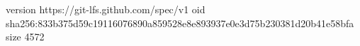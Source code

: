 version https://git-lfs.github.com/spec/v1
oid sha256:833b375d59c19116076890a859528e8e893937e0e3d75b230381d20b41e58bfa
size 4572

